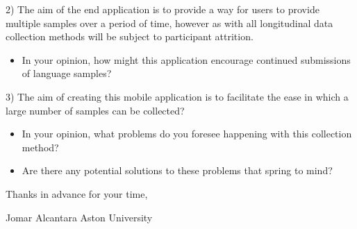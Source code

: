 \documentclass{article}
\begin{document}
2) The aim of the end application is to provide a way for users to provide multiple samples over a period of time, however as with all longitudinal data collection methods will be subject to participant attrition.
\begin{itemize}	
	\item In your opinion, how might this application encourage continued submissions of language samples?
\end{itemize}	

3) The aim of creating this mobile application is to facilitate the ease in which a large number of samples can be collected? 
\begin{itemize}	
	\item In your opinion, what problems do you foresee happening with this collection method? 
	\item Are there any potential solutions to these problems that spring to mind?
\end{itemize}	
\par 
Thanks in advance for your time,

Jomar Alcantara
Aston University
\end{document}
